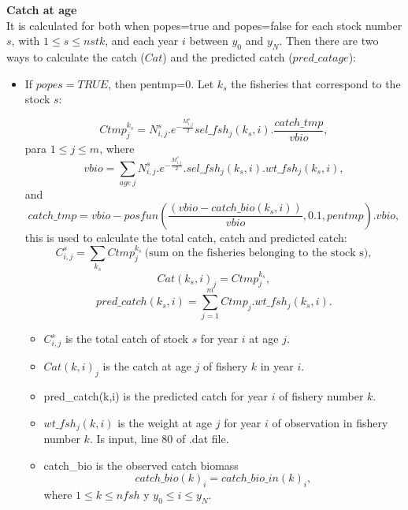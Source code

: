 \documentclass{article}
\begin{document}
\textbf{Catch at age}\\
It is calculated for both when popes=true and popes=false for each stock number $s$, with $1\leq s \leq nstk$, and  each year $i$ between $y_0$ and $y_N$. Then there are two ways to calculate the catch ($Cat$) and the predicted catch ($pred\_catage$):
\begin{itemize}
    \item If $popes=TRUE$, then pentmp=0. Let  $k_s$ the fisheries that correspond to the stock $s$:
        
    \begin{equation}
        Ctmp^{k_s}_j=N^s_{i,j}.e^{-\frac{M^s_{i,j}}{2}}sel\_fsh_j(k_s,i).\dfrac{catch\_tmp}{vbio},
    \end{equation}
    para $1\leq j \leq m$, where
    \begin{equation}
        vbio=\sum_{age\ j}N^s_{i,j}.e^{-\frac{M^s_{i,j}}{2}}.sel\_fsh_j(k_s,i).wt\_fsh_j(k_s,i),
    \end{equation}
    and 
        \begin{equation}
        catch\_tmp=vbio-posfun\left(\frac{(vbio - catch\_bio(k_s,i))}{vbio} , 0.1 , pentmp \right).vbio,
    \end{equation}
    this is used to calculate the total catch, catch and predicted catch:
    \begin{equation}
        C^s_{i,j}=\sum_{k_s}Ctmp^{k_s}_j \ \text{(sum on the fisheries belonging to the stock s)},
    \end{equation}
    \begin{equation}
        Cat(k_s,i)_j=Ctmp^{k_s}_j,
    \end{equation}
    \begin{equation}
            pred\_catch(k_s,i)=\sum_{j=1}^{m}Ctmp_j.wt\_fsh_j(k_s,i).
        \end{equation} 
\begin{itemize}
    \item $C^s_{i,j}$ is the total catch of stock $s$ for year $i$ at age $j$.
    \item $Cat(k,i)_j$ is the catch at age $j$ of fishery $k$ in year $i$.
    \item pred\_catch(k,i) is the predicted catch for year $i$ of fishery number $k$.
    \item $wt\_fsh_j(k,i)$ is the weight at age $j$ for year $i$ of observation in fishery number $k$. Is input, line 80 of .dat file.
        \item catch\_bio is the observed catch biomass
        \begin{equation}
          catch\_bio(k)_i=catch\_bio\_in(k)_i,  
        \end{equation}
        where $1\leq k \leq nfsh$ y $y_0\leq i \leq y_N$.


\end{itemize}
\end{itemize}
\end{document}
